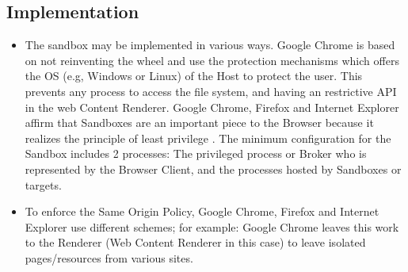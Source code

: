 \documentclass{sig-alternate-05-2015}
\begin{document}
  \subsection*{Implementation}
  \begin{itemize}
    \item The sandbox may be implemented in various ways. Google Chrome \cite{sandboxGC} is based on not reinventing the wheel and use the protection mechanisms which offers the OS (e.g, Windows or Linux) of the Host to protect the user. This prevents any process to access the file system, and having an restrictive API in the web Content Renderer. Google Chrome, Firefox and Internet Explorer affirm that Sandboxes are an important piece to the Browser because it realizes the principle of least privilege \cite{Yason,sandboxGC,sandboxFirefox}. The minimum configuration for the Sandbox includes 2 processes: The privileged process or Broker who is represented by the Browser Client, and the processes hosted by Sandboxes or targets.
    \item To enforce the Same Origin Policy, Google Chrome, Firefox and Internet Explorer use different schemes; for example: Google Chrome leaves this work to the Renderer (Web Content Renderer in this case) to leave isolated pages/resources from various sites.
  \end{itemize}
\end{document}
